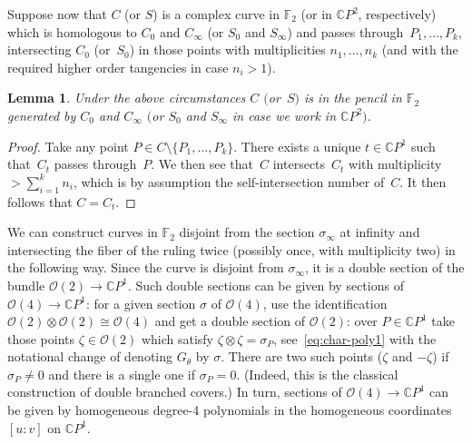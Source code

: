 \documentclass[10pt,a4paper]{amsart}
\newcommand{\CP}[1]{\mathbb{C}P^{#1}} %
\numberwithin{equation}{section}
\newtheorem{lem}[prop]{Lemma}
\begin{document}
Suppose now that $C$ (or $S$) is a complex curve in ${\mathbb {F}}_2$
(or in $\CP{2}$, respectively) which is homologous to $C_0$ and
$C_{\infty}$ (or $S_0$ and $S_{\infty}$) and passes through~$P_1,
\ldots , P_k$, intersecting $C_0$ (or~$S_0$) in those points with
multiplicities $n_1, \ldots ,n_k$ (and with the required higher order
tangencies in case $n_i>1$).

\begin{lem} \label{lem:princ} Under the above circumstances $C$ $($or~$S)$ is in the pencil in ${\mathbb {F}}_2$ generated by $C_0$ and $C_{\infty}$ $($or $S_0$ and $S_{\infty}$ in case we work in $\CP{2})$.
\end{lem}
\begin{proof}
Take any point $P\in C\setminus \{ P_1, \ldots , P_k \}$. There exists a unique $t\in \CP1$ such that~$C_t$ passes through~$P$. We then see that~$C$ intersects~$C_t$ with multiplicity $>\sum_{i=1}^kn_i$, which is by assumption the self-intersection number of~$C$. It then follows that $C = C_t$.
\end{proof}

We can construct curves in ${\mathbb {F}}_2$ disjoint from the section
$\sigma _{\infty}$ at infinity and intersecting the fiber of the ruling
twice (possibly once, with multiplicity two) in the following way.
Since the curve is disjoint from $\sigma _{\infty}$, it is a double section
of the bundle ${\mathcal {O}}(2)\to \CP{1}$. Such double sections
can be given by sections of ${\mathcal {O}}(4)\to \CP{1}$:
for a given section $\sigma$ of ${\mathcal {O}}(4)$, use
the identification ${\mathcal {O}}(2)\otimes {\mathcal {O}}(2)\cong
{\mathcal {O}}(4)$ and get a double section of ${\mathcal {O}}(2)$:
over $P\in \CP{1}$ take those points $\zeta \in {\mathcal {O}}(2)$ which
satisfy $\zeta \otimes \zeta =\sigma _P$, see~\eqref{eq:char-poly1} with
the notational change of denoting
$G_{\theta}$ by $\sigma$.
There are two such points ($\zeta $ and $-\zeta $)
if $\sigma _P\neq 0$ and there is a single one if $\sigma _P=0$.
(Indeed, this is the classical construction of double branched covers.)
In turn, sections of ${\mathcal {O}}(4)\to \CP{1}$ can be given by
homogeneous degree-4 polynomials in the homogeneous coordinates
$[u:v]$ on $\CP{1}$.
\end{document}

